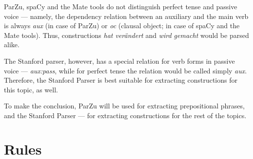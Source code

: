 ParZu, spaCy and the Mate tools do not distinguish perfect tense and passive voice --- namely, the dependency relation between an auxiliary and the main verb is always \textit{aux} (in case of ParZu) or \textit{oc} (clausal object; in case of spaCy and the Mate tools). Thus, constructions \textit{hat verändert} and \textit{wird gemacht} would be parsed alike.

The Stanford parser, however, has a special relation for verb forms in passive voice --- \textit{aux:pass}, while for perfect tense the relation would be called simply \textit{aux}.  Therefore, the Stanford Parser is best suitable for extracting constructions for this topic, as well.

To make the conclusion, ParZu will be used for extracting prepositional phrases, and the Stanford Parser --- for extracting constructions for the rest of the topics.

\section{Rules}
